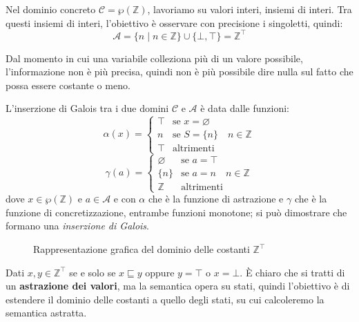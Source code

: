 Nel dominio concreto $\mathcal{C}= \wp(\mathbb{Z})$, lavoriamo su valori interi, 
insiemi di interi. Tra questi insiemi di interi, l'obiettivo è osservare con 
precisione i singoletti, quindi:
\[
    \mathcal{A} = \{n \mid n \in \mathbb{Z}\} \cup \{\bot, \top\} = \mathbb{Z}^\top
\]

Dal momento in cui una variabile colleziona più di un valore possibile,
l'informazione non è più precisa, quindi non è più possibile dire nulla 
sul fatto che possa essere costante o meno.

L'inserzione di Galois tra i due domini $\mathcal{C}$ e $\mathcal{A}$ è 
data dalle funzioni: 
\[
    \alpha(x) = 
    \begin{cases}
        \top & \text{se } x = \varnothing \\
        n & \text{se } S = \{n\} \quad n\in \mathbb{Z} \\
        \top & \text{altrimenti}
    \end{cases}
\]
\[
    \gamma(a) = 
    \begin{cases}
        \varnothing & \text{se } a = \top \\
        \{n\} & \text{se } a = n \quad n\in \mathbb{Z} \\
        \mathbb{Z} & \text{altrimenti}
    \end{cases}
\]
dove $x \in \wp(\mathbb{Z})$ e $a \in \mathcal{A}$ e
con $\alpha$ che è la funzione di astrazione e $\gamma$ che è la funzione di concretizzazione, 
entrambe funzioni monotone; si può dimostrare che formano una \textit{inserzione di Galois}.
\begin{figure}[H]
    \centering
    \caption{Rappresentazione grafica del dominio delle costanti $\mathbb{Z}^\top$}
\end{figure}
Dati $x,y \in \mathbb{Z}^\top$ se e solo se $x \sqsubseteq y$ oppure $y=\top$ o $x=\bot$.
È chiaro che si tratti di un \textbf{astrazione dei valori}, ma la semantica opera su stati, 
quindi l'obiettivo è di estendere il dominio delle costanti a quello degli stati, su cui 
calcoleremo la semantica astratta.

